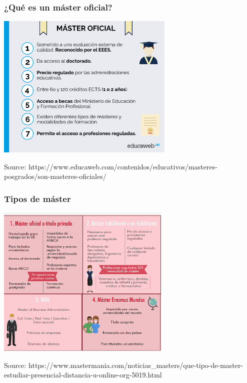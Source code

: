 
\begin{frame}
\frametitle{¿Qué es un máster oficial?}


\begin{center}
  \includegraphics[width=8.5cm]{figs/master-oficial.jpg}
\end{center}

\vspace{-0.8cm}
\begin{flushright}
{\tiny
Source: https://www.educaweb.com/contenidos/educativos/masteres-posgrados/son-masteres-oficiales/
}
\end{flushright}

\end{frame}



\begin{frame}
\frametitle{Tipos de máster}


\begin{center}
  \includegraphics[width=8.3cm]{figs/tipos-master.png}
\end{center}

\vspace{-0.8cm}
\begin{flushright}
{\tiny
Source: https://www.mastermania.com/noticias\_masters/que-tipo-de-master-estudiar-presencial-distancia-u-online-org-5019.html
}
\end{flushright}

\end{frame}


